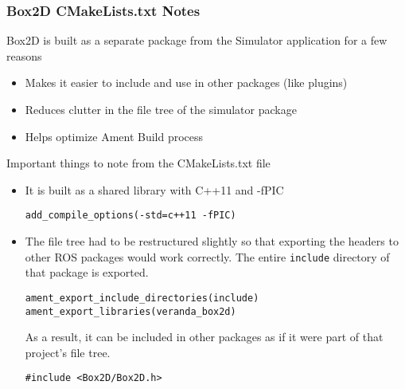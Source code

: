 \subsubsection*{Box2D CMakeLists.txt Notes}
Box2D is built as a separate package from the Simulator application for a few reasons
\begin{itemize}
	\item Makes it easier to include and use in other packages (like plugins)
	\item Reduces clutter in the file tree of the simulator package
	\item Helps optimize Ament Build process
\end{itemize}

Important things to note from the CMakeLists.txt file
\begin{itemize}
	\item It is built as a shared library with C++11 and -fPIC
	\begin{lstlisting}
add_compile_options(-std=c++11 -fPIC)
	\end{lstlisting}
	\item The file tree had to be restructured slightly so that exporting the headers to other ROS packages would work correctly. The entire \lstinline|include| directory of that package is exported.

	\begin{lstlisting}
ament_export_include_directories(include)
ament_export_libraries(veranda_box2d)
	\end{lstlisting}
	As a result, it can be included in other packages as if it were part of that project's file tree.
	\begin{lstlisting}
#include <Box2D/Box2D.h>
	\end{lstlisting}
\end{itemize}
